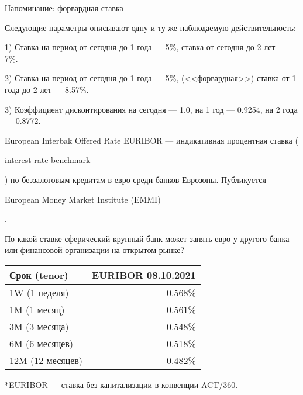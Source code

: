 \documentclass{beamer}
\newcommand{\en}[1]{\begin{otherlanguage}{english}#1\end{otherlanguage}}
\begin{document}
\begin{frame}{Напоминание: форвардная ставка}
\centering
{}
	
\justify
Следующие параметры описывают одну и ту же наблюдаемую действительность:

1) Ставка на период от сегодня до 1 года --- 5\%, ставка от сегодня до 2 лет --- 7\%.

2) Ставка на период от сегодня до 1 года --- 5\%, (<<форвардная>>) ставка от 1 года до 2 лет --- 8.57\%.

3) Коэффициент дисконтирования на сегодня --- 1.0, на 1 год --- 0.9254, на 2 года --- 0.8772. 
\end{frame}



\begin{frame}{European Interbak Offered Rate}
\justify
\alert{EURIBOR} --- индикативная процентная ставка (\en{interest rate benchmark}) по беззалоговым кредитам в евро среди банков Еврозоны. Публикуется \en{European Money Market Institute (EMMI)}.

\justify
По какой ставке сферический крупный банк может занять евро у другого банка или финансовой организации на открытом рынке? 

\justify
\centering
\begin{tabular}{l|r}
Срок (tenor)     & EURIBOR 08.10.2021 \\ \hline
1W (1 неделя)    & -0.568\% \\
1M (1 месяц)     & -0.561\% \\
3M (3 месяца)    & -0.548\% \\
6M (6 месяцев)   & -0.518\% \\
12M (12 месяцев) & -0.482\% 
\end{tabular}

\justify
*EURIBOR --- ставка без капитализации в конвенции ACT/360.
\end{frame}
\end{document}
